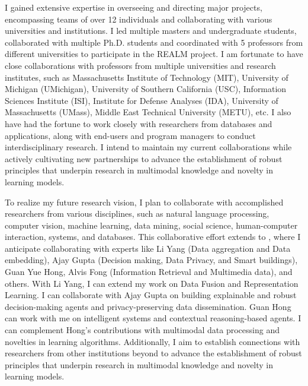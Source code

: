 I gained extensive expertise in overseeing and directing major projects, encompassing teams of over 12 individuals and collaborating with various universities and institutions.
I led multiple masters and undergraduate students, collaborated with multiple Ph.D. students and coordinated with 5 professors from different universities to participate in the REALM project. I am fortunate to have close collaborations with professors from multiple universities and research institutes, such as Massachusetts Institute of Technology (MIT), University of Michigan (UMichigan), University of Southern California (USC), Information Sciences Institute (ISI), Institute for Defense Analyses (IDA), University of Massachusetts (UMass), Middle East Technical University (METU), etc. I also have had the fortune to work closely with researchers from databases and applications, along with end-users and program managers to conduct interdisciplinary research. 
%
%
%
%
I intend to maintain my current collaborations while actively cultivating new partnerships to advance the establishment of robust principles that underpin research in multimodal knowledge and novelty in learning models.
%

To realize my future research vision, I plan to collaborate with accomplished researchers from various disciplines, such as natural language processing, computer vision, machine learning, data mining, social science, human-computer interaction, systems, and databases. 
This collaborative effort extends to \shortInstitutionName{}, where I anticipate collaborating with experts like Li Yang (Data aggregation and Data embedding), Ajay Gupta (Decision making, Data Privacy, and Smart buildings), Guan Yue Hong, Alvis Fong (Information Retrieval and Multimedia data), and others. With Li Yang, I can extend my work on Data Fusion and Representation Learning. I can collaborate with Ajay Gupta on building explainable and robust decision-making agents and privacy-preserving data dissemination. Guan Hong can work with me on intelligent systems and contextual reasoning-based agents. I can complement Hong's contributions with multimodal data processing and novelties in learning algorithms.
%
%
Additionally, I aim to establish connections with researchers from other 
institutions beyond \shortInstitutionName{} to advance the establishment of robust principles that underpin research in multimodal knowledge and novelty in learning models. 

